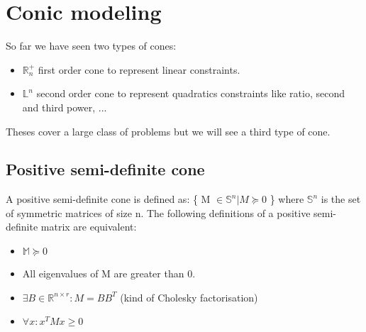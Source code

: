 %
%
%
%
%


\section{Conic modeling}
So far we have seen two types of cones: 
\begin{itemize}
\item $\mathbb{R}_n^+$ first order cone to represent linear constraints.
\item $\mathbb{L}^n$ second order cone to represent quadratics constraints like ratio, second and third power, ...
\end{itemize}
Theses cover a large class of problems but we will see a third type of cone. 
\subsection{Positive semi-definite cone}
A positive semi-definite cone is defined as: \{ M $\in \mathbb{S}^n | M \succeq 0 $ \} where $ \mathbb{S}^n$ is the set of symmetric matrices of size n. 
The following definitions of a positive semi-definite matrix are equivalent:
\begin{itemize}
\item $\mathbb{M} \succeq 0 $
\item All eigenvalues of M are greater than 0.
\item $\exists B \in \mathbb{R}^{n \times r}: M = BB^T  $ (kind of Cholesky factorisation)
\item $\forall x: x^T M x \geq 0$  
\end{itemize}

